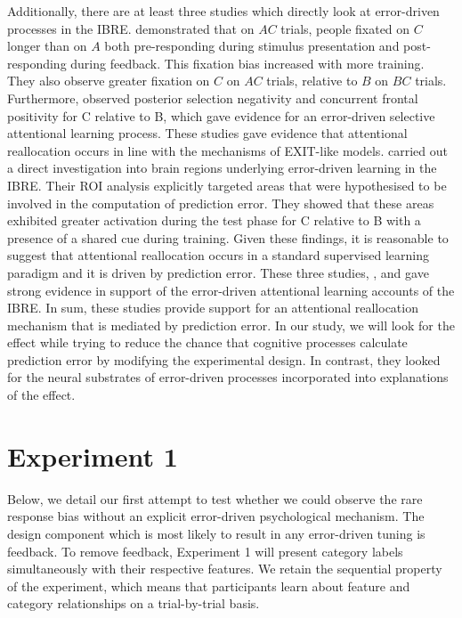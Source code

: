 \documentclass[10pt,letterpaper]{article}
\begin{document}
Additionally, there are at least three studies which directly look at error-driven processes in the IBRE.
 demonstrated that on $AC$ trials, people fixated on $C$ longer than on $A$ both pre-responding during stimulus presentation and post-responding during feedback.
This fixation bias increased with more training.
They also observe greater fixation on $C$ on $AC$ trials, relative to $B$ on $BC$ trials.
Furthermore,  observed posterior selection negativity and concurrent frontal positivity for C relative to B, which gave evidence for an error-driven selective attentional learning process.
These studies gave evidence that attentional reallocation occurs in line with the mechanisms of EXIT-like models.
 carried out a direct investigation into brain regions underlying error-driven learning in the IBRE.
Their ROI analysis explicitly targeted areas that were hypothesised to be involved in the computation of prediction error.
They showed that these areas exhibited greater activation during the test phase for C relative to B with a presence of a shared cue during training.
Given these findings, it is reasonable to suggest that attentional reallocation occurs in a standard supervised learning paradigm and it is driven by prediction error.
These three studies, ,  and  gave strong evidence in support of the error-driven attentional learning accounts of the IBRE.
In sum, these studies provide support for an attentional reallocation mechanism that is mediated by prediction error.
In our study, we will look for the effect while trying to reduce the chance that cognitive processes calculate prediction error by modifying the experimental design.
In contrast, they looked for the neural substrates of error-driven processes incorporated into explanations of the effect.

\section{Experiment 1}

Below, we detail our first attempt to test whether we could observe the rare response bias without an explicit error-driven psychological mechanism.
The design component which is most likely to result in any error-driven tuning is feedback.
To remove feedback, Experiment 1 will present category labels simultaneously with their respective features.
We retain the sequential property of the experiment, which means that participants learn about feature and category relationships on a trial-by-trial basis.
\end{document}
